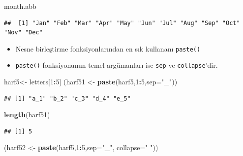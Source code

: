 \documentclass[
  oneside]{book}
\newenvironment{Shaded}{\begin{snugshade}}{\end{snugshade}}
\newcommand{\AttributeTok}[1]{\textcolor[rgb]{0.13,0.29,0.53}{#1}}
\newcommand{\DecValTok}[1]{\textcolor[rgb]{0.00,0.00,0.81}{#1}}
\newcommand{\FunctionTok}[1]{\textcolor[rgb]{0.13,0.29,0.53}{\textbf{#1}}}
\newcommand{\NormalTok}[1]{#1}
\newcommand{\OtherTok}[1]{\textcolor[rgb]{0.56,0.35,0.01}{#1}}
\newcommand{\SpecialCharTok}[1]{\textcolor[rgb]{0.81,0.36,0.00}{\textbf{#1}}}
\newcommand{\StringTok}[1]{\textcolor[rgb]{0.31,0.60,0.02}{#1}}
\providecommand{\tightlist}{%
  \setlength{\itemsep}{0pt}\setlength{\parskip}{0pt}}
\begin{document}
\begin{Shaded}
\begin{Highlighting}[]
\NormalTok{month.abb}
\end{Highlighting}
\end{Shaded}

\begin{verbatim}
##  [1] "Jan" "Feb" "Mar" "Apr" "May" "Jun" "Jul" "Aug" "Sep" "Oct" "Nov" "Dec"
\end{verbatim}

\begin{itemize}
\tightlist
\item
  Nesne birleştirme fonksiyonlarından en sık kullananı \texttt{paste()}
\item
  \texttt{paste()} fonksiyonunun temel argümanları ise \texttt{sep} ve \texttt{collapse}'dir.
\end{itemize}

\begin{Shaded}
\begin{Highlighting}[]
\NormalTok{harf5}\OtherTok{\textless{}{-}}\NormalTok{ letters[}\DecValTok{1}\SpecialCharTok{:}\DecValTok{5}\NormalTok{]}
\NormalTok{(harf51 }\OtherTok{\textless{}{-}} \FunctionTok{paste}\NormalTok{(harf5,}\DecValTok{1}\SpecialCharTok{:}\DecValTok{5}\NormalTok{,}\AttributeTok{sep=}\StringTok{"\_"}\NormalTok{))}
\end{Highlighting}
\end{Shaded}

\begin{verbatim}
## [1] "a_1" "b_2" "c_3" "d_4" "e_5"
\end{verbatim}

\begin{Shaded}
\begin{Highlighting}[]
\FunctionTok{length}\NormalTok{(harf51)}
\end{Highlighting}
\end{Shaded}

\begin{verbatim}
## [1] 5
\end{verbatim}

\begin{Shaded}
\begin{Highlighting}[]
\NormalTok{(harf52 }\OtherTok{\textless{}{-}} \FunctionTok{paste}\NormalTok{(harf5,}\DecValTok{1}\SpecialCharTok{:}\DecValTok{5}\NormalTok{,}\AttributeTok{sep=}\StringTok{"\_"}\NormalTok{,}
                 \AttributeTok{collapse=}\StringTok{" "}\NormalTok{))}
\end{Highlighting}
\end{Shaded}
\end{document}
